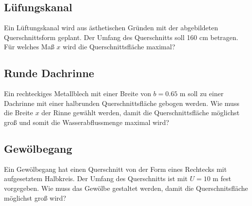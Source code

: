 
\subsection{Lüfungskanal}
Ein Lüftungskanal wird aus ästhetischen
Gründen mit der abgebildeten Querschnittsform
geplant. Der Umfang des Querschnitts soll
160 cm betragen.
Für welches Maß $x$ wird die Querschnittsfläche
maximal?


\subsection{Runde Dachrinne}
Ein rechteckiges Metallblech mit einer Breite
von $b = 0.65 \text{ m}$ soll zu einer Dachrinne mit einer
halbrunden Querschnittsfläche gebogen werden.
Wie muss die Breite $x$ der Rinne gewählt werden,
damit die Querschnittsfläche möglichst groß und somit
die Wasserabflussmenge maximal wird?




\subsection{Gewölbegang}

Ein Gewölbegang hat einen Querschnitt
von der Form eines Rechtecks mit aufgesetztem Halbkreis. Der Umfang
des Querschnitts ist mit $U=10 \text{ m}$ fest vorgegeben.
Wie muss das Gewölbe gestaltet werden, damit die Querschnitsfläche
möglichst groß wird?


\newpage
